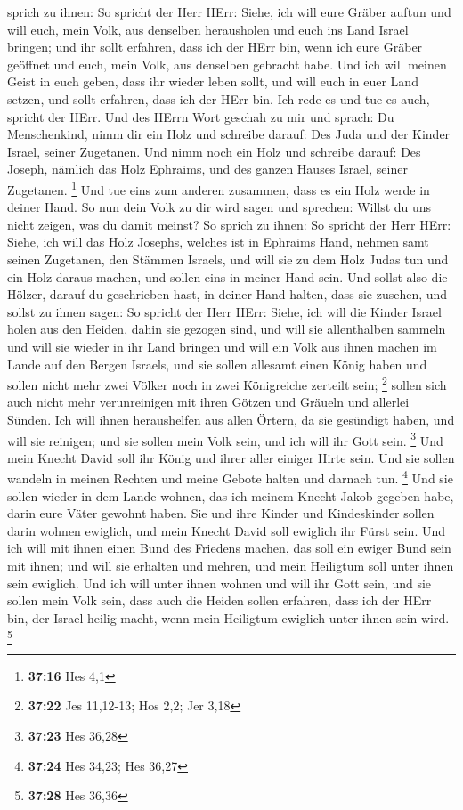 sprich zu ihnen: So spricht der Herr HErr: Siehe, ich will eure Gräber
auftun und will euch, mein Volk, aus denselben herausholen und euch ins
Land Israel bringen;  und ihr sollt erfahren, dass ich der
HErr bin, wenn ich eure Gräber geöffnet und euch, mein Volk, aus
denselben gebracht habe.  Und ich will meinen Geist in euch
geben, dass ihr wieder leben sollt, und will euch in euer Land setzen,
und sollt erfahren, dass ich der HErr bin. Ich rede es und tue es auch,
spricht der HErr.  Und des HErrn Wort geschah zu mir und
sprach:  Du Menschenkind, nimm dir ein Holz und schreibe
darauf: Des Juda und der Kinder Israel, seiner Zugetanen. Und nimm noch
ein Holz und schreibe darauf: Des Joseph, nämlich das Holz Ephraims, und
des ganzen Hauses Israel, seiner Zugetanen. \footnote{\textbf{37:16} Hes
  4,1}  Und tue eins zum anderen zusammen, dass es ein Holz
werde in deiner Hand.  So nun dein Volk zu dir wird sagen
und sprechen: Willst du uns nicht zeigen, was du damit meinst?
 So sprich zu ihnen: So spricht der Herr HErr: Siehe, ich
will das Holz Josephs, welches ist in Ephraims Hand, nehmen samt seinen
Zugetanen, den Stämmen Israels, und will sie zu dem Holz Judas tun und
ein Holz daraus machen, und sollen eins in meiner Hand sein.
 Und sollst also die Hölzer, darauf du geschrieben hast, in
deiner Hand halten, dass sie zusehen,  und sollst zu ihnen
sagen: So spricht der Herr HErr: Siehe, ich will die Kinder Israel holen
aus den Heiden, dahin sie gezogen sind, und will sie allenthalben
sammeln und will sie wieder in ihr Land bringen  und will
ein Volk aus ihnen machen im Lande auf den Bergen Israels, und sie
sollen allesamt einen König haben und sollen nicht mehr zwei Völker noch
in zwei Königreiche zerteilt sein; \footnote{\textbf{37:22} Jes
  11,12-13; Hos 2,2; Jer 3,18}  sollen sich auch nicht mehr
verunreinigen mit ihren Götzen und Gräueln und allerlei Sünden. Ich will
ihnen heraushelfen aus allen Örtern, da sie gesündigt haben, und will
sie reinigen; und sie sollen mein Volk sein, und ich will ihr Gott sein.
\footnote{\textbf{37:23} Hes 36,28}  Und mein Knecht David
soll ihr König und ihrer aller einiger Hirte sein. Und sie sollen
wandeln in meinen Rechten und meine Gebote halten und darnach tun.
\footnote{\textbf{37:24} Hes 34,23; Hes 36,27}  Und sie
sollen wieder in dem Lande wohnen, das ich meinem Knecht Jakob gegeben
habe, darin eure Väter gewohnt haben. Sie und ihre Kinder und
Kindeskinder sollen darin wohnen ewiglich, und mein Knecht David soll
ewiglich ihr Fürst sein.  Und ich will mit ihnen einen Bund
des Friedens machen, das soll ein ewiger Bund sein mit ihnen; und will
sie erhalten und mehren, und mein Heiligtum soll unter ihnen sein
ewiglich.  Und ich will unter ihnen wohnen und will ihr
Gott sein, und sie sollen mein Volk sein,  dass auch die
Heiden sollen erfahren, dass ich der HErr bin, der Israel heilig macht,
wenn mein Heiligtum ewiglich unter ihnen sein wird. \footnote{\textbf{37:28}
  Hes 36,36}

